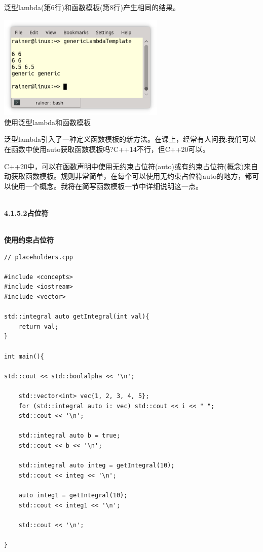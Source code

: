 泛型lambda(第6行)和函数模板(第8行)产生相同的结果。

\begin{center}
\includegraphics[width=0.6\textwidth]{content/3/chapter4/images/8.png}\\
使用泛型lambda和函数模板
\end{center}

泛型lambda引入了一种定义函数模板的新方法。在课上，经常有人问我:我们可以在函数中使用auto获取函数模板吗?C++14不行，但C++20可以。

C++20中，可以在函数声明中使用无约束占位符(auto)或有约束占位符(概念)来自动获取函数模板。规则非常简单，在每个可以使用无约束占位符auto的地方，都可以使用一个概念。我将在简写函数模板一节中详细说明这一点。

\hspace*{\fill} \\ %
\noindent
\textbf{4.1.5.2\hspace{0.2cm}占位符}

\hspace*{\fill} \\ %
\noindent
\textbf{使用约束占位符}
\begin{lstlisting}[style=styleCXX]
// placeholders.cpp

#include <concepts>
#include <iostream>
#include <vector>

std::integral auto getIntegral(int val){
	return val;
}

int main(){

std::cout << std::boolalpha << '\n';
	
	std::vector<int> vec{1, 2, 3, 4, 5};
	for (std::integral auto i: vec) std::cout << i << " ";
	std::cout << '\n';
	
	std::integral auto b = true;
	std::cout << b << '\n';
	
	std::integral auto integ = getIntegral(10);
	std::cout << integ << '\n';
	
	auto integ1 = getIntegral(10);
	std::cout << integ1 << '\n';
	
	std::cout << '\n';

}
\end{lstlisting}

